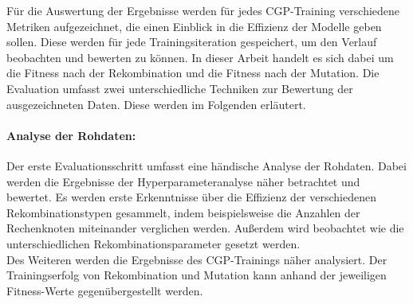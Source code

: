 Für die Auswertung der Ergebnisse werden für jedes CGP-Training verschiedene Metriken aufgezeichnet, die einen Einblick in die Effizienz der Modelle geben sollen.
Diese werden für jede Trainingsiteration gespeichert, um den Verlauf beobachten und bewerten zu können.
In dieser Arbeit handelt es sich dabei um die Fitness nach der Rekombination und die Fitness nach der Mutation.
Die Evaluation umfasst zwei unterschiedliche Techniken zur Bewertung der ausgezeichneten Daten.
Diese werden im Folgenden erläutert.
\paragraph{Analyse der Rohdaten:} Der erste Evaluationsschritt umfasst eine händische Analyse der Rohdaten.
Dabei werden die Ergebnisse der Hyperparameteranalyse näher betrachtet und bewertet.
Es werden erste Erkenntnisse über die Effizienz der verschiedenen Rekombinationstypen gesammelt, indem beispielsweise die Anzahlen der Rechenknoten miteinander verglichen werden.
Außerdem wird beobachtet wie die unterschiedlichen Rekombinationsparameter gesetzt werden.\\
Des Weiteren werden die Ergebnisse des CGP-Trainings näher analysiert.
Der Trainingserfolg von Rekombination und Mutation kann anhand der jeweiligen Fitness-Werte gegenübergestellt werden.
